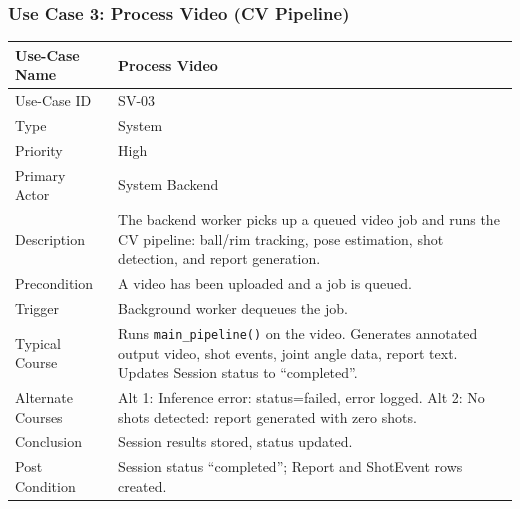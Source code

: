 ﻿\documentclass[11pt,a4paper]{article}
\begin{document}
\subsubsection*{Use Case 3: Process Video (CV Pipeline)}
\begin{longtable}{|L{3.5cm}|L{11cm}|}
\hline
Use-Case Name & Process Video \\ \hline
Use-Case ID & SV-03 \\ \hline
Type & System \\ \hline
Priority & High \\ \hline
Primary Actor & System Backend \\ \hline
Description & The backend worker picks up a queued video job and runs the CV pipeline: ball/rim tracking, pose estimation, shot detection, and report generation. \\ \hline
Precondition & A video has been uploaded and a job is queued. \\ \hline
Trigger & Background worker dequeues the job. \\ \hline
Typical Course & Runs \texttt{main\_pipeline()} on the video. Generates annotated output video, shot events, joint angle data, report text. Updates Session status to ``completed''. \\ \hline
Alternate Courses & Alt 1: Inference error: status=failed, error logged. Alt 2: No shots detected: report generated with zero shots. \\ \hline
Conclusion & Session results stored, status updated. \\ \hline
Post Condition & Session status ``completed''; Report and ShotEvent rows created. \\ \hline
\end{longtable}
\end{document}
